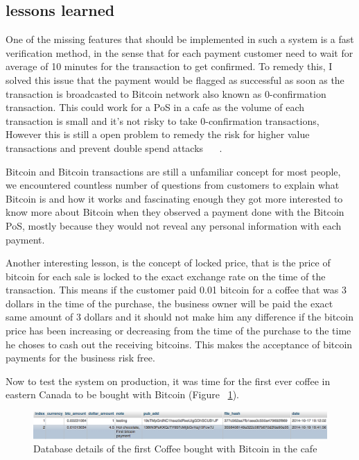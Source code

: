\subsection{lessons learned}
One of the missing features that should be implemented in such a system is a fast verification method, in the sense that for each payment customer need to wait for average of 10 minutes for the transaction to get confirmed. To remedy this, I solved this issue that the payment would be flagged as successful as soon as the transaction is broadcasted to Bitcoin network also known as 0-confirmation transaction. This could work for a PoS in a cafe as the volume of each transaction is small and it's not risky to take 0-confirmation transactions, However this is still a open problem to remedy the risk for higher value transactions and prevent double spend attacks ~\cite{karame2012two} ~\cite{bamert2013have}.

Bitcoin and Bitcoin transactions are still a unfamiliar concept for most people, we encountered countless number of questions from customers to explain what Bitcoin is and how it works and fascinating enough they got more interested to know more about Bitcoin when they observed a payment done with the Bitcoin PoS, mostly because they would not reveal any personal information with each payment.

Another interesting lesson, is the concept of locked price, that is the price of bitcoin for each sale is locked to the exact exchange rate on the time of the transaction. This means if the customer paid 0.01 bitcoin for a coffee that was 3 dollars in the time of the purchase, the business owner will be paid the exact same amount of 3 dollars and it should not make him any difference if the bitcoin price has been increasing or decreasing from the time of the purchase to the time he choses to cash out the receiving bitcoins. This makes the acceptance of bitcoin payments for the business risk free.

Now to test the system on production, it was time for the first ever coffee in eastern Canada to be bought with Bitcoin (Figure ~\ref{fig:firsttransaction}).

\begin{figure}[htb!p]
\centering
\includegraphics[width=\linewidth]{fig/first_cafe_transaction.png}
  \caption{Database details of the first Coffee bought with Bitcoin in the cafe}
\label{fig:firsttransaction}
\end{figure}



